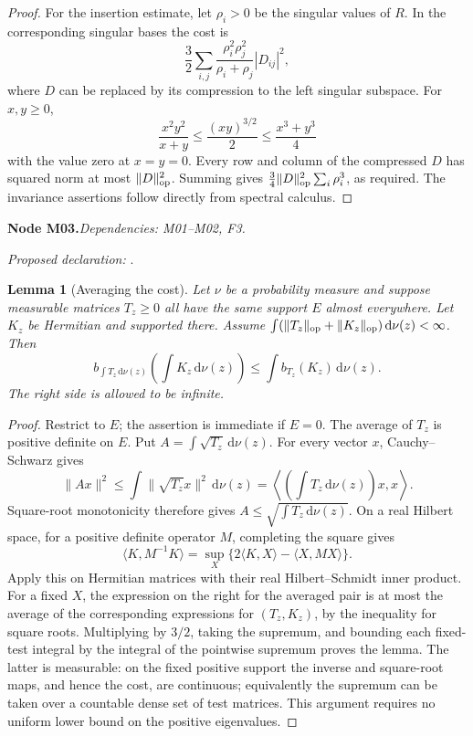 \documentclass[11pt]{article}
\newtheorem{lemma}[theorem]{Lemma}
\theoremstyle{remark}\newtheorem{remark}[theorem]{Remark}
\newcommand{\dd}{\,\mathrm d}\newcommand{\tr}{\operatorname{tr}}
\newcommand{\bpnode}[3]{\par\Needspace{5\baselineskip}\noindent\textbf{Node #1.}\quad\textit{Dependencies: #2.}\par\noindent\textit{Proposed declaration:} \texttt{\detokenize{#3}}.\par\smallskip}
\begin{document}
\begin{proof}
For the insertion estimate, let $\rho_i>0$ be the singular values of $R$. In the corresponding singular bases the cost is
\[
 \frac32\sum_{i,j}\frac{\rho_i^2\rho_j^2}{\rho_i+\rho_j}|D_{ij}|^2,
\]
where $D$ can be replaced by its compression to the left singular subspace. For $x,y\geq0$,
\[
 \frac{x^2y^2}{x+y}\leq\frac{(xy)^{3/2}}2\leq\frac{x^3+y^3}{4}
\]
with the value zero at $x=y=0$. Every row and column of the compressed $D$ has squared norm at most $\|D\|_{\mathrm{op}}^2$. Summing gives $\frac34\|D\|_{\mathrm{op}}^2\sum_i\rho_i^3$, as required. The invariance assertions follow directly from spectral calculus.
\end{proof}

\bpnode{M03}{M01--M02, F3}{matrix_cost_probability_average}
\begin{lemma}[Averaging the cost]\label{lem:convexity}
Let $\nu$ be a probability measure and suppose measurable matrices $T_z\geq0$ all have the same support $E$ almost everywhere. Let $K_z$ be Hermitian and supported there. Assume $\int(\|T_z\|_{\op}+\|K_z\|_{\op})\dd\nu(z)<\infty$. Then
\[
 b_{\int T_z\dd\nu(z)}\left(\int K_z\dd\nu(z)\right)
 \leq\int b_{T_z}(K_z)\dd\nu(z).
\]
The right side is allowed to be infinite.
\end{lemma}
\begin{proof}
Restrict to $E$; the assertion is immediate if $E=0$. The average of $T_z$ is positive definite on $E$. Put $A=\int\sqrt{T_z}\dd\nu(z)$. For every vector $x$, Cauchy--Schwarz gives
\[
 \|Ax\|^2\leq\int\|\sqrt{T_z}x\|^2\dd\nu(z)
 =\left\langle\left(\int T_z\dd\nu(z)\right)x,x\right\rangle.
\]
Square-root monotonicity therefore gives
$A\leq\sqrt{\int T_z\dd\nu(z)}$.
On a real Hilbert space, for a positive definite operator $M$, completing the square gives
\[
 \langle K,M^{-1}K\rangle
 =\sup_X\{2\langle K,X\rangle-\langle X,MX\rangle\}.
\]
Apply this on Hermitian matrices with their real Hilbert--Schmidt inner product. For a fixed $X$, the expression on the right for the averaged pair is at most the average of the corresponding expressions for $(T_z,K_z)$, by the inequality for square roots. Multiplying by $3/2$, taking the supremum, and bounding each fixed-test integral by the integral of the pointwise supremum proves the lemma. The latter is measurable: on the fixed positive support the inverse and square-root maps, and hence the cost, are continuous; equivalently the supremum can be taken over a countable dense set of test matrices. This argument requires no uniform lower bound on the positive eigenvalues.
\end{proof}
\end{document}
